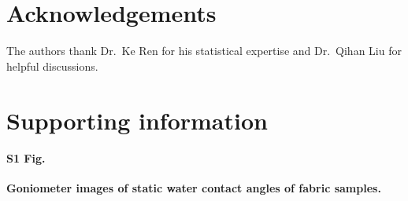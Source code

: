 \documentclass[10pt,letterpaper]{article}
\begin{document}
\section*{Acknowledgements}

The authors thank Dr.~Ke Ren for his statistical expertise and Dr.~Qihan Liu for helpful discussions. 


\section*{Supporting information}


\paragraph*{S1 Fig.}
\label{S1_Fig}
{\bf Goniometer images of static water contact angles of fabric samples.}
\end{document}
